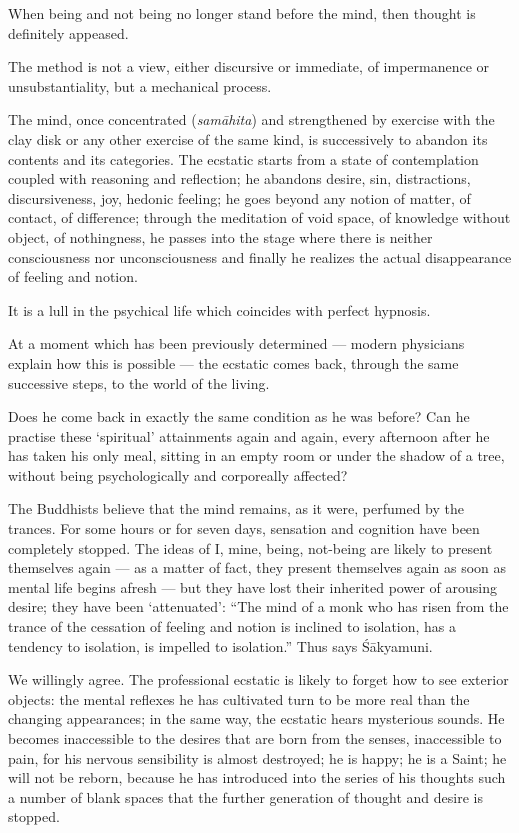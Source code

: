 \documentclass[a4paper, 11pt, oneside, english]{article}
\begin{document}
When being and not being no longer stand before the mind, then thought is definitely appeased.

The method is not a view, either discursive or immediate, of impermanence or unsubstantiality, but a mechanical process.

The mind, once concentrated (\emph{samāhita}) and strengthened by exercise with the clay disk or any other exercise of the same kind, is successively to abandon its contents and its categories. The ecstatic starts from a state of contemplation coupled with reasoning and reflection; he abandons desire, sin, distractions, discursiveness, joy, hedonic feeling; he goes beyond any notion of matter, of contact, of difference; through the meditation of void space, of knowledge without object, of nothingness, he passes into the stage where there is neither consciousness nor unconsciousness and finally he realizes the actual disappearance of feeling and notion.

It is a lull in the psychical life which coincides with perfect hypnosis.

At a moment which has been previously determined --- modern physicians explain how this is possible --- the ecstatic comes back, through the same successive steps, to the world of the living.

Does he come back in exactly the same condition as he was before? Can he practise these `spiritual' attainments again and again, every afternoon after he has taken his only meal, sitting in an empty room or under the shadow of a tree, without being psychologically and corporeally affected?

The Buddhists believe that the mind remains, as it were, perfumed by the trances. For some hours or for seven days, sensation and cognition have been completely stopped. The ideas of I, mine, being, not-being are likely to present themselves again --- as a matter of fact, they present themselves again as soon as mental life begins afresh --- but they have lost their inherited power of arousing desire; they have been `attenuated': ``The mind of a monk who has risen from the trance of the cessation of feeling and notion is inclined to isolation, has a tendency to isolation, is impelled to isolation.'' Thus says Śākyamuni.

We willingly agree. The professional ecstatic is likely to forget how to see exterior objects: the mental reflexes he has cultivated turn to be more real than the changing appearances; in the same way, the ecstatic hears mysterious sounds. He becomes inaccessible to the desires that are born from the senses, inaccessible to pain, for his nervous sensibility is almost destroyed; he is happy; he is a Saint; he will not be reborn, because he has introduced into the series of his thoughts such a number of blank spaces that the further generation of thought and desire is stopped.
\end{document}
